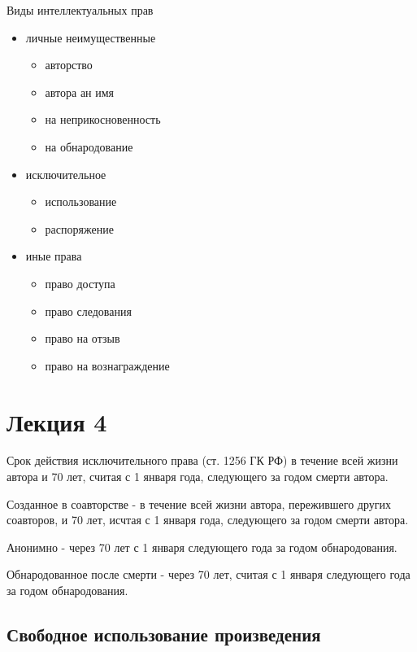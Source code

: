 \documentclass[12pt]{article}
\begin{document}
Виды интеллектуальных прав
\begin{itemize}
    \item личные неимущественные
    \begin{itemize}
    \item авторство
    \item автора ан имя
    \item на неприкосновенность
    \item на обнародование
    \end{itemize}
    \item исключительное
    \begin{itemize}
    \item использование
    \item распоряжение
    \end{itemize}   
    \item иные права
    \begin{itemize}
    \item право доступа
    \item право следования
    \item право на отзыв
    \item право на вознаграждение
\end{itemize}   
\end{itemize}
\section{Лекция 4}
Срок действия исключительного права (ст. 1256 ГК РФ)
в течение всей жизни автора и 70 лет, считая с 1 
января года, следующего за годом смерти автора.

Созданное в соавторстве - в течение всей жизни автора, 
пережившего других соавторов, и 70 лет, исчтая с 1 января года,
следующего за годом смерти автора.

Анонимно - через 70 лет с 1 января следующего года за годом обнародования.

Обнародованное после смерти - через 70 лет, считая 
с 1 января следующего года за годом обнародования.
\hypertarget{ux441ux432ux43eux431ux43eux434ux43dux43eux435-ux438ux441ux43fux43eux43bux44cux437ux43eux432ux430ux43dux438ux435-ux43fux440ux43eux438ux437ux432ux435ux434ux435ux43dux438ux44f}{%
\subsection{Свободное использование
произведения}\label{ux441ux432ux43eux431ux43eux434ux43dux43eux435-ux438ux441ux43fux43eux43bux44cux437ux43eux432ux430ux43dux438ux435-ux43fux440ux43eux438ux437ux432ux435ux434ux435ux43dux438ux44f}}
\end{document}
